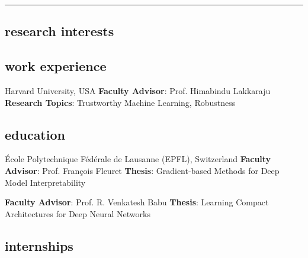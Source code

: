 \documentclass[11pt, a4paper, english]{moderncv}        %
\newcommand{\cvsection}[1]{\vspace{0.3cm}\subsection{\Large{{#1}}}}
\begin{document}
\pagecolor{floralwhite}

\makecvtitle

\vspace{-1.7cm}
\textcolor{gray}{\hrule}


\cvsection{research interests}


\cvsection{work experience}
{\newline Harvard University, USA}
{\newline \textbf{Faculty Advisor}: Prof. Himabindu Lakkaraju 
\newline \textbf{Research Topics}: Trustworthy Machine Learning, Robustness}{}

\cvsection{education}
{ \newline \'{E}cole Polytechnique F\'{e}d\'{e}rale de Lausanne (EPFL), Switzerland}
{ \newline \textbf{Faculty Advisor}: Prof. Fran\c{c}ois Fleuret
  \newline \textbf{Thesis}: Gradient-based Methods for Deep Model Interpretability}
{}
\vspace*{0.5em}

{ \newline \textbf{Faculty Advisor}: Prof. R. Venkatesh Babu
\newline \textbf{Thesis}: Learning Compact Architectures for Deep Neural Networks}{} 

\cvsection{internships}

\end{document}
